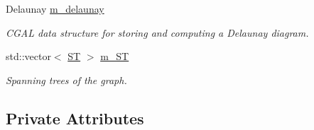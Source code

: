 \begin{DoxyCompactItemize}
Delaunay \hyperlink{classcmst_1_1_graph2_d_af19557df59901e6078c2038652c95623}{m\_delaunay}
\begin{DoxyCompactList}\small\item\em CGAL data structure for storing and computing a Delaunay diagram. \end{DoxyCompactList}\item 
std::vector$<$ \hyperlink{structcmst_1_1_graph2_d_1_1_s_t}{ST} $>$ \hyperlink{classcmst_1_1_graph2_d_a829dc681f90679478b0ba9676af0bc03}{m\_ST}
\begin{DoxyCompactList}\small\item\em Spanning trees of the graph. \end{DoxyCompactList}\end{DoxyCompactItemize}
\subsection*{Private Attributes}
